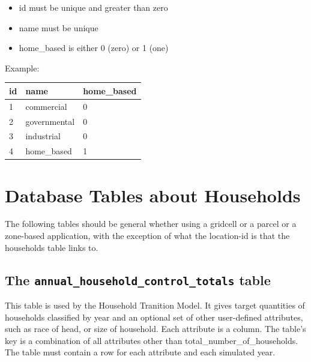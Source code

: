 \begin{itemize} \tight
\item id must be unique and greater than zero
\item name must be unique
\item home_based is either 0 (zero) or 1 (one)
\end{itemize}

Example:\\[2mm]
\begin{tabular}{lll}
id & name & home_based \\\hline
1 & commercial & 0 \\\hline
2 & governmental & 0  \\\hline
3 & industrial & 0 \\\hline
4 & home_based & 1 \\\hline
\end{tabular}



\section{Database Tables about Households}
\label{sec:household-tables}

The following tables should be general whether using a gridcell or a parcel or a zone-based 
application, with the exception of what the location-id is that the households table links to.

\subsection{The {\tt annual_household_control_totals} table}
\label{sec:household-tables-ahct}

This table is used by the Household Tranition Model.
It gives target quantities of households classified by year and an
optional set of other user-defined attributes, such as
race of
head, or size of household.  Each attribute is a column.  The table's key is 
a combination of all
attributes other than total_number_of_households.  The table must
contain a row for each attribute and each simulated year.


